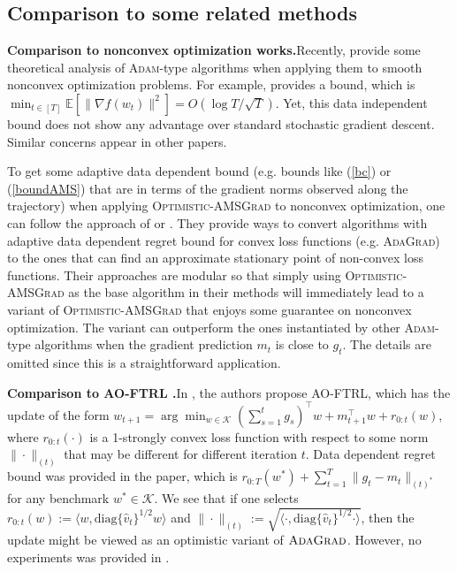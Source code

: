 \documentclass[11pt]{article}
\def\K{\mathcal{K}}
\theoremstyle{k}
\begin{document}
\subsection{Comparison to some related methods} \label{app:related}

\textbf{Comparison to nonconvex optimization works.}\hspace{0.1in}Recently, \cite{ZRSKK18,CLSH19,WWB18,ZTYCG18,ZS18,LO18} provide some theoretical analysis 
of \textsc{Adam}-type algorithms when applying them to smooth nonconvex optimization problems.
For example, \cite{CLSH19} provides a bound,
which is $\min_{t \in [T]} \mathbb{E}[\| \nabla f(w_t) \|^2 ] = O(\log T / \sqrt{T}) $.
Yet, this data independent bound does not show any advantage over standard stochastic gradient descent. Similar concerns appear in other papers.

To get some adaptive data dependent bound (e.g. bounds like (\ref{bc}) or (\ref{boundAMS})
that are in terms of the gradient norms observed along the trajectory) when applying 
\textsc{Optimistic-AMSGrad} to nonconvex optimization,
one can follow the approach of \cite{Princeton18} or \cite{CYYZC19}.
They provide ways to convert algorithms with adaptive data dependent regret bound
for convex loss functions (e.g. \textsc{AdaGrad}) to the ones that can find an approximate stationary point of non-convex loss functions. 
Their approaches are modular so that simply using \textsc{Optimistic-AMSGrad}
as the base algorithm in their methods will immediately lead to a variant of \textsc{Optimistic-AMSGrad} that enjoys some guarantee on nonconvex optimization.
The variant can outperform the ones instantiated by other \textsc{Adam}-type algorithms when
the gradient prediction $m_t$ is close to $g_t$.
The details are omitted since this is a straightforward application.

\textbf{Comparison to AO-FTRL \cite{MY16}.}\hspace{0.1in}In \cite{MY16}, the authors propose AO-FTRL, which has the update of 
the form $w_{t+1} = \arg\min_{{w \in \K}} ( \sum_{s=1}^t g_s )^{\top}  w + m_{t+1}^\top w + r_{0:t}(w) $, where $r_{0:t}(\cdot)$ is a 1-strongly convex loss function with respect to some norm $\| \cdot\|_{(t)}$ that may be different for different iteration $t$. 
Data dependent regret bound was provided in the paper, which is $r_{{0:T}}(w^*) + \sum_{t=1}^T \| g_t - m_t \|_{(t)^*}$ for any benchmark $w^{*} \in \K$. We see that if
one selects $r_{0:t}(w) := \langle w, \text{diag}\{\hat{v}_t\}^{1/2} w \rangle$ 
and $\| \cdot \|_{(t)}:= 
\sqrt{ \langle \cdot, \text{diag}\{\hat{v}_t\}^{1/2} \cdot \rangle }$, then the update might be viewed as an optimistic variant of $\textsc{AdaGrad}$. However, no experiments was provided in \cite{MY16}. 
\end{document}
